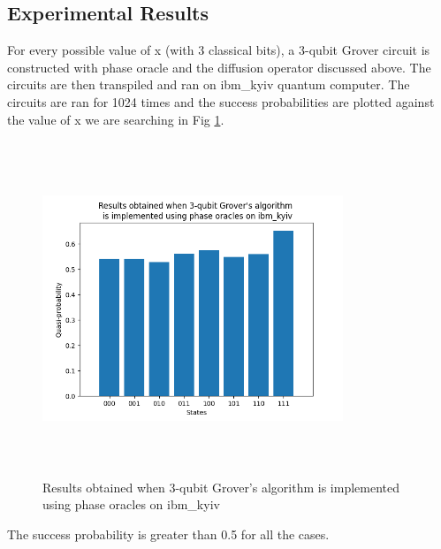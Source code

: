 \documentclass[conference]{IEEEtran}
\begin{document}
\subsection{Experimental Results}
For every possible value of x (with 3 classical bits), a 3-qubit Grover circuit is constructed with phase oracle and the diffusion operator discussed above. The circuits are then transpiled and ran on ibm\_kyiv quantum computer.
The circuits are ran for 1024 times and the success probabilities are plotted against the value of x we are searching in Fig \ref{fig:ibm_kyiv_results}.
\begin{figure}[htbp]
	\centerline{\includegraphics[width=9cm,height=10cm,keepaspectratio]{ibm_kyiv_phase_oracles.png}}
	\caption{Results obtained when 3-qubit Grover's algorithm is implemented using phase oracles on ibm\_kyiv}
	\label{fig:ibm_kyiv_results}
\end{figure}
The success probability is greater than 0.5 for all the cases.
\end{document}
